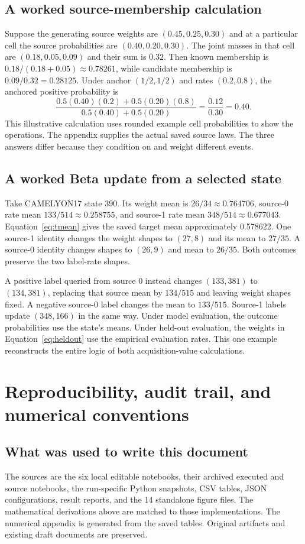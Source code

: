 \documentclass[11pt,a4paper]{report}
\begin{document}
\section{A worked source-membership calculation}
Suppose the generating source weights are $(0.45,0.25,0.30)$ and at a particular cell the source probabilities are $(0.40,0.20,0.30)$. The joint masses in that cell are $(0.18,0.05,0.09)$ and their sum is $0.32$. Then known membership is $0.18/(0.18+0.05)\approx0.78261$, while candidate membership is $0.09/0.32=0.28125$. Under anchor $(1/2,1/2)$ and rates $(0.2,0.8)$, the anchored positive probability is
\begin{equation}
\frac{0.5(0.40)(0.2)+0.5(0.20)(0.8)}{0.5(0.40)+0.5(0.20)}
=\frac{0.12}{0.30}=0.40.
\end{equation}
This illustrative calculation uses rounded example cell probabilities to show the operations. The appendix supplies the actual saved source laws. The three answers differ because they condition on and weight different events.

\section{A worked Beta update from a selected state}
Take CAMELYON17 state 390. Its weight mean is $26/34\approx0.764706$, source-0 rate mean $133/514\approx0.258755$, and source-1 rate mean $348/514\approx0.677043$. Equation~\eqref{eq:tmean} gives the saved target mean approximately 0.578622. One source-1 identity changes the weight shapes to $(27,8)$ and its mean to $27/35$. A source-0 identity changes shapes to $(26,9)$ and mean to $26/35$. Both outcomes preserve the two label-rate shapes.

A positive label queried from source 0 instead changes $(133,381)$ to $(134,381)$, replacing that source mean by $134/515$ and leaving weight shapes fixed. A negative source-0 label changes the mean to $133/515$. Source-1 labels update $(348,166)$ in the same way. Under model evaluation, the outcome probabilities use the state's means. Under held-out evaluation, the weights in Equation~\eqref{eq:heldout} use the empirical evaluation rates. This one example reconstructs the entire logic of both acquisition-value calculations.

\chapter{Reproducibility, audit trail, and numerical conventions}
\section{What was used to write this document}
The sources are the six local editable notebooks, their archived executed and source notebooks, the run-specific Python snapshots, CSV tables, JSON configurations, result reports, and the 14 standalone figure files. The mathematical derivations above are matched to those implementations. The numerical appendix is generated from the saved tables. Original artifacts and existing draft documents are preserved.
\end{document}
